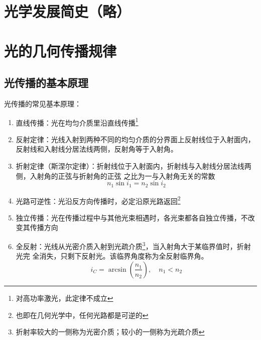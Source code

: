 \documentclass[UTF8]{report}
\theoremstyle{MyLineTheoremStyle} %
\theoremstyle{MyBlockTheoremStyle} %
\theoremstyle{MySubsubsectionStyle} %
\begin{document}
\section{光学发展简史（略）}


\section{光的几何传播规律}

\subsection{光传播的基本原理}

光传播的常见基本原理：
\begin{enumerate}
    \item 直线传播：光在均匀介质里沿直线传播\footnote{对高功率激光，此定律不成立}
    \item 反射定律：光线入射到两种不同的均匀介质的分界面上反射线位于入射面内，反射线和入射线分居法线两侧，反射角等于入射角。
    \item 折射定律（斯涅尔定律）：折射线位于入射面内，折射线与入射线分居法线两侧，入射角的正弦与折射角的正弦
    之比为一与入射角无关的常数
    \begin{equation}
    n_1\sin i_1 = n_2 \sin i_2
    \end{equation}    
    \item 光路可逆性：光沿反方向传播时，必定沿原光路返回\footnote{也即在几何光学中，任何光路都是可逆的}
    \item 独立传播：光在传播过程中与其他光束相遇时，各光束都各自独立传播，不改变其传播方向
    \item 全反射：光线从光密介质入射到光疏介质\footnote{折射率较大的一侧称为光密介质；较小的一侧称为光疏介质}，当入射角大于某临界值时，折射光完
    全消失，只剩下反射光。该临界角度称为全反射临界角。
    \begin{equation}
    i_C = \arcsin \left(\frac{n_1}{n_2}\right),\quad n_1<n_2
    \end{equation}
\end{enumerate}
\end{document}
